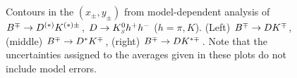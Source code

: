 \begin{figure}[htbp]
\begin{center}
{    }
    \hfill
  \end{center}
  \vspace{-0.5cm}
  \caption{
    Contours in the $(x_\pm, y_\pm)$ from model-dependent analysis of $B^\mp \to D^{(*)}K^{(*)\pm}$, $D \to K^0_{\scriptscriptstyle S} h^+ h^-$ ($h = \pi,K$).
    (Left) $B^\mp \to DK^\mp$, 
    (middle) $B^\mp \to D^*K^\mp$,
    (right) $B^\mp \to DK^{*\mp}$.
    Note that the uncertainties assigned to the averages given in these plots
    do not include model errors.        
  }
  \label{fig:cp_uta:cus:dalitz_2d}
\end{figure}

